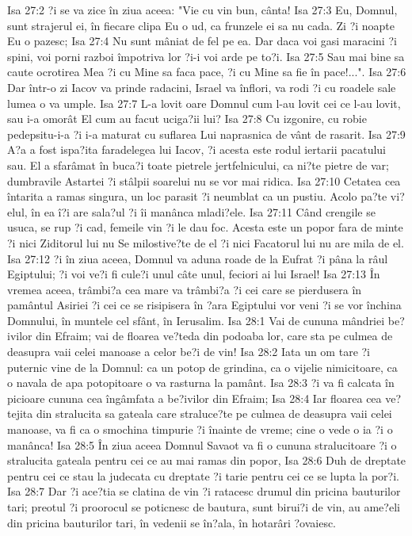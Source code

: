 Isa 27:2  ?i se va zice în ziua aceea: "Vie cu vin bun, cânta!
Isa 27:3  Eu, Domnul, sunt strajerul ei, în fiecare clipa Eu o ud, ca frunzele ei sa nu cada. Zi ?i noapte Eu o pazesc;
Isa 27:4  Nu sunt mâniat de fel pe ea. Dar daca voi gasi maracini ?i spini, voi porni razboi împotriva lor ?i-i voi arde pe to?i.
Isa 27:5  Sau mai bine sa caute ocrotirea Mea ?i cu Mine sa faca pace, ?i cu Mine sa fie în pace!...".
Isa 27:6  Dar într-o zi Iacov va prinde radacini, Israel va înflori, va rodi ?i cu roadele sale lumea o va umple.
Isa 27:7  L-a lovit oare Domnul cum l-au lovit cei ce l-au lovit, sau i-a omorât El cum au facut uciga?ii lui?
Isa 27:8  Cu izgonire, cu robie pedepsitu-i-a ?i i-a maturat cu suflarea Lui naprasnica de vânt de rasarit.
Isa 27:9  A?a a fost ispa?ita faradelegea lui Iacov, ?i acesta este rodul iertarii pacatului sau. El a sfarâmat în buca?i toate pietrele jertfelnicului, ca ni?te pietre de var; dumbravile Astartei ?i stâlpii soarelui nu se vor mai ridica.
Isa 27:10  Cetatea cea întarita a ramas singura, un loc parasit ?i neumblat ca un pustiu. Acolo pa?te vi?elul, în ea î?i are sala?ul ?i îi manânca mladi?ele.
Isa 27:11  Când crengile se usuca, se rup ?i cad, femeile vin ?i le dau foc. Acesta este un popor fara de minte ?i nici Ziditorul lui nu Se milostive?te de el ?i nici Facatorul lui nu are mila de el.
Isa 27:12  ?i în ziua aceea, Domnul va aduna roade de la Eufrat ?i pâna la râul Egiptului; ?i voi ve?i fi cule?i unul câte unul, feciori ai lui Israel!
Isa 27:13  În vremea aceea, trâmbi?a cea mare va trâmbi?a ?i cei care se pierdusera în pamântul Asiriei ?i cei ce se risipisera în ?ara Egiptului vor veni ?i se vor închina Domnului, în muntele cel sfânt, în Ierusalim.
Isa 28:1  Vai de cununa mândriei be?ivilor din Efraim; vai de floarea ve?teda din podoaba lor, care sta pe culmea de deasupra vaii celei manoase a celor be?i de vin!
Isa 28:2  Iata un om tare ?i puternic vine de la Domnul: ca un potop de grindina, ca o vijelie nimicitoare, ca o navala de apa potopitoare o va rasturna la pamânt.
Isa 28:3  ?i va fi calcata în picioare cununa cea îngâmfata a be?ivilor din Efraim;
Isa 28:4  Iar floarea cea ve?tejita din stralucita sa gateala care straluce?te pe culmea de deasupra vaii celei manoase, va fi ca o smochina timpurie ?i înainte de vreme; cine o vede o ia ?i o manânca!
Isa 28:5  În ziua aceea Domnul Savaot va fi o cununa stralucitoare ?i o stralucita gateala pentru cei ce au mai ramas din popor,
Isa 28:6  Duh de dreptate pentru cei ce stau la judecata cu dreptate ?i tarie pentru cei ce se lupta la por?i.
Isa 28:7  Dar ?i ace?tia se clatina de vin ?i ratacesc drumul din pricina bauturilor tari; preotul ?i proorocul se poticnesc de bautura, sunt birui?i de vin, au ame?eli din pricina bauturilor tari, în vedenii se în?ala, în hotarâri ?ovaiesc.

